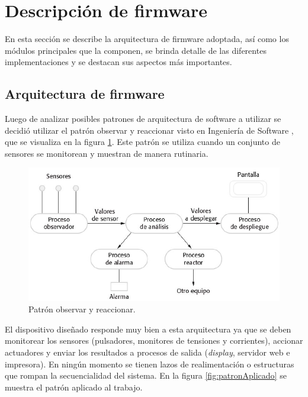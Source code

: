 \section{Descripción de firmware}

En esta sección se describe la arquitectura de firmware adoptada, así como los módulos principales que la componen, se brinda detalle de las diferentes implementaciones y se destacan sus aspectos más importantes.

\subsection{Arquitectura de firmware}
Luego de analizar posibles patrones de arquitectura de software a utilizar se decidió utilizar el patrón observar y reaccionar visto en Ingeniería de Software \citep{INGSOFT}, que se visualiza en la figura \ref{fig:patron}. Este patrón se utiliza cuando un conjunto de sensores se monitorean y muestran de manera rutinaria.

\begin{figure}[htpb]
	\centering
	\includegraphics[scale=0.55]{./Figures/patron.png}
	\caption{Patrón observar y reaccionar.}
	\label{fig:patron}
\end{figure}

El dispositivo diseñado responde muy bien a esta arquitectura ya que se deben monitorear los sensores (pulsadores, monitores de tensiones y corrientes), accionar actuadores y enviar los resultados a procesos de salida (\textit{display}, servidor web e impresora). En ningún momento se tienen lazos de realimentación o estructuras que rompan la secuencialidad del sistema. En la figura \ref{fig:patronAplicado} se muestra el patrón aplicado al trabajo.

